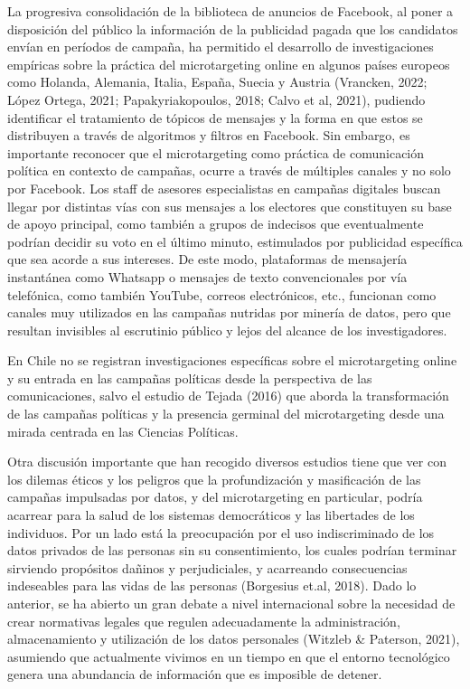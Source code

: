 \documentclass[
  10pt,
  letterpaper,
]{report}
\begin{document}
La progresiva consolidación de la biblioteca de anuncios de Facebook, al
poner a disposición del público la información de la publicidad pagada
que los candidatos envían en períodos de campaña, ha permitido el
desarrollo de investigaciones empíricas sobre la práctica del
microtargeting online en algunos países europeos como Holanda, Alemania,
Italia, España, Suecia y Austria (Vrancken, 2022; López Ortega, 2021;
Papakyriakopoulos, 2018; Calvo et al, 2021), pudiendo identificar el
tratamiento de tópicos de mensajes y la forma en que estos se
distribuyen a través de algoritmos y filtros en Facebook. Sin embargo,
es importante reconocer que el microtargeting como práctica de
comunicación política en contexto de campañas, ocurre a través de
múltiples canales y no solo por Facebook. Los staff de asesores
especialistas en campañas digitales buscan llegar por distintas vías con
sus mensajes a los electores que constituyen su base de apoyo principal,
como también a grupos de indecisos que eventualmente podrían decidir su
voto en el último minuto, estimulados por publicidad específica que sea
acorde a sus intereses. De este modo, plataformas de mensajería
instantánea como Whatsapp o mensajes de texto convencionales por vía
telefónica, como también YouTube, correos electrónicos, etc., funcionan
como canales muy utilizados en las campañas nutridas por minería de
datos, pero que resultan invisibles al escrutinio público y lejos del
alcance de los investigadores.

En Chile no se registran investigaciones específicas sobre el
microtargeting online y su entrada en las campañas políticas desde la
perspectiva de las comunicaciones, salvo el estudio de Tejada (2016) que
aborda la transformación de las campañas políticas y la presencia
germinal del microtargeting desde una mirada centrada en las Ciencias
Políticas.

Otra discusión importante que han recogido diversos estudios tiene que
ver con los dilemas éticos y los peligros que la profundización y
masificación de las campañas impulsadas por datos, y del microtargeting
en particular, podría acarrear para la salud de los sistemas
democráticos y las libertades de los individuos. Por un lado está la
preocupación por el uso indiscriminado de los datos privados de las
personas sin su consentimiento, los cuales podrían terminar sirviendo
propósitos dañinos y perjudiciales, y acarreando consecuencias
indeseables para las vidas de las personas (Borgesius et.al, 2018). Dado
lo anterior, se ha abierto un gran debate a nivel internacional sobre la
necesidad de crear normativas legales que regulen adecuadamente la
administración, almacenamiento y utilización de los datos personales
(Witzleb \& Paterson, 2021), asumiendo que actualmente vivimos en un
tiempo en que el entorno tecnológico genera una abundancia de
información que es imposible de detener.
\end{document}
